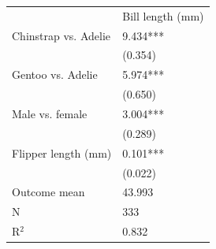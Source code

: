 \begin{tabular}{ll}
& Bill length (mm) \\
Chinstrap vs. Adelie & 9.434*** \\
& (0.354) \\
Gentoo vs. Adelie & 5.974*** \\
& (0.650) \\
Male vs. female & 3.004*** \\
& (0.289) \\
Flipper length (mm) & 0.101*** \\
& (0.022) \\
Outcome mean & 43.993 \\
N & 333 \\
R$^2$ & 0.832 \\
\end{tabular}
